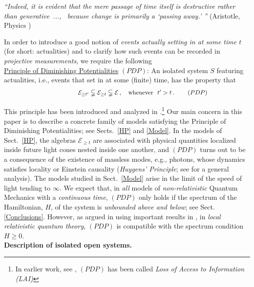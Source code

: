 \documentclass[a4paper,11pt]{article}
\begin{document}
\hspace{0.5cm}\textit{``Indeed, it is evident that the mere passage of time itself is destructive rather than 
\mbox{generative ..., } because change is primarily a `passing away.' ''}  (Aristotle, Physics )

In order to introduce a good notion of \textit{events actually setting in at some time $t$} (for short: actualities) and to clarify 
how such events can be recorded in \textit{projective measurements}, we require the following \\

\underline{Principle of Diminishing Potentialities} $(PDP)$: An isolated system $S$ featuring actualities, i.e., events that set in 
at some (finite) time, has the property that
\begin{equation}\label{PDP}
 \hspace{4.2cm}  \mathcal{E}_{\geq t'} \subsetneqq \mathcal{E}_{\geq t} \subsetneqq \mathcal{E}\,, \quad \text{whenever}\,\,\,\, t'>t\,. \qquad\, (PDP) \hspace{2.4cm} \square
 \end{equation}


This principle has been introduced and analyzed in \cite{F-Schub, BFS, Fr1, Fr2}.\footnote{In earlier work, see \cite{BFS}, $(PDP)$ has 
been called \textit{Loss of Access to Information (LAI)}} 
Our main concern in this paper is to describe a concrete family of models satisfying the Principle of Diminishing Potentialities; 
see Sects.~\ref{HP} and \ref{Model}. In the models of Sect.~\ref{HP}, the algebras $\mathcal{E}_{\geq t}$ are associated with 
physical quantities localized inside future light cones nested inside one another, and $(PDP)$ turns out to be a 
consequence of the existence of massless modes, e.g., photons, whose dynamics satisfies locality or Einstein 
causality (\textit{Huygens' Principle}; see \cite{Buchholz} for a general analysis).
The models studied in Sect.~\ref{Model} arise in the limit of the speed of light tending to $\infty$. We expect that, in 
\textit{all} models of \textit{non-relativistic} Quantum Mechanics with a \textit{continuous time}, $(PDP)$ only holds 
if the spectrum of the Hamiltonian, $H$, of the system is \textit{unbounded above and below}; see Sect. \ref{Conclusions}. 
However, as argued in \cite{Fr2} using important results in \cite{Buchholz}, in \textit{local relativistic quantum theory}, 
$(PDP)$ is compatible with the spectrum condition 
$H\geq 0$.\\

{\bf{Description of isolated open systems.}}\\
\end{document}

